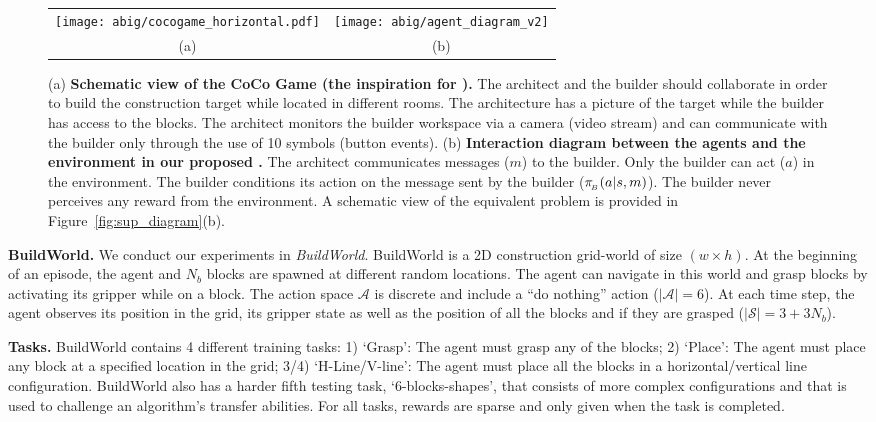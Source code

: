 \begin{figure}[!h]
    \centering
    \begin{tabular}{cc}
    \texttt{[image: abig/cocogame\_horizontal.pdf]} &\texttt{[image: abig/agent\_diagram\_v2]} \\
    \small(a) & \small (b) 
    \end{tabular}
    \caption{(a) \textbf{Schematic view of the CoCo Game (the inspiration for \abp).} The architect and the builder should collaborate in order to build the construction target while located in different rooms. The architecture has a picture of the target while the builder has access to the blocks. The architect monitors the builder workspace via a camera (video stream) and can communicate with the builder only through the use of 10 symbols (button events). (b) \textbf{Interaction diagram between the agents and the environment in our proposed \abp.} The architect communicates messages ($m$) to the builder.  Only the builder can act ($a$) in the environment. The builder conditions its action on the message sent by the builder ($\pi_{\!_B}(a|s,m)$). The builder never perceives any reward from the environment. A schematic view of the equivalent \abp problem is provided in Figure~\ref{fig:sup_diagram}(b).}
    \label{fig:agent-diagram}
\end{figure}


\textbf{BuildWorld. }
We conduct our experiments in \textit{BuildWorld}. BuildWorld is a 2D construction grid-world of size $(w\times h)$. At the beginning of an episode, the agent and $N_b$ blocks are spawned at different random locations. The agent can navigate in this world and grasp blocks by activating its gripper while on a block. The action space $\mathcal{A}$ is discrete and include a ``do nothing'' action ($|\mathcal{A}|=6$).
At each time step, the agent observes its position in the grid, its gripper state as well as the position of all the blocks and if they are grasped ($|\mathcal{S}|=3+3N_{b}$). 

\textbf{Tasks. } BuildWorld contains 4 different training tasks: 1) `Grasp': The agent must grasp any of the blocks; 2) `Place': The agent must place any block at a specified location in the grid; 3/4) `H-Line/V-line': The agent must place all the blocks in a horizontal/vertical line configuration. BuildWorld also has a harder fifth testing task, `6-blocks-shapes', that consists of more complex configurations and that is used to challenge an algorithm's transfer abilities. For all tasks, rewards are sparse and only given when the task is completed. 

